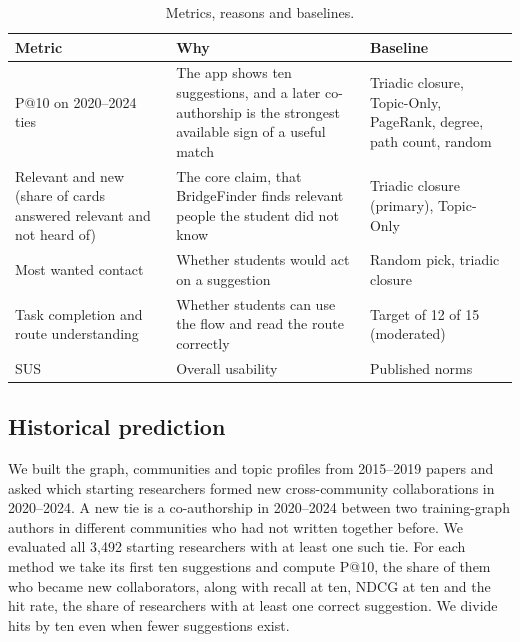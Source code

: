 \documentclass[sigconf,nonacm]{acmart}
\begin{document}
\begin{table}[t]
\caption{Metrics, reasons and baselines.}
\label{tab:metrics}
\small
\begin{tabularx}{\columnwidth}{@{}>{\raggedright\arraybackslash}p{}>{\raggedright\arraybackslash}X>{\raggedright\arraybackslash}p{}@{}}
\toprule
Metric & Why & Baseline\\
\midrule
P@10 on 2020--2024 ties & The app shows ten suggestions, and a later co-authorship is the strongest available sign of a useful match & Triadic closure, Topic-Only, PageRank, degree, path count, random\\
Relevant and new (share of cards answered relevant and not heard of) & The core claim, that BridgeFinder finds relevant people the student did not know & Triadic closure (primary), Topic-Only\\
Most wanted contact & Whether students would act on a suggestion & Random pick, triadic closure\\
Task completion and route understanding & Whether students can use the flow and read the route correctly & Target of 12 of 15 (moderated)\\
SUS & Overall usability & Published norms~\cite{bangor2008}\\
\bottomrule
\end{tabularx}
\end{table}

\subsection{Historical prediction}\label{sec:historical}
We built the graph, communities and topic profiles from 2015--2019 papers and asked which starting researchers formed new cross-community collaborations in 2020--2024. A new tie is a co-authorship in 2020--2024 between two training-graph authors in different communities who had not written together before. We evaluated all 3,492 starting researchers with at least one such tie. For each method we take its first ten suggestions and compute P@10, the share of them who became new collaborators, along with recall at ten, NDCG at ten and the hit rate, the share of researchers with at least one correct suggestion. We divide hits by ten even when fewer suggestions exist.
\end{document}
